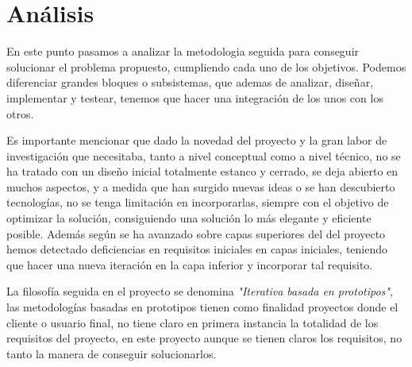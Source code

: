 \chapter{Análisis}

\bigskip
En este punto pasamos a analizar la metodologia seguida para conseguir solucionar el problema propuesto, cumpliendo cada uno de los objetivos. 
Podemos diferenciar grandes bloques o subsistemas, que ademas de analizar, diseñar, implementar y testear, tenemos que  hacer una integración de los unos con los otros.

\bigskip
Es importante mencionar que dado la novedad del proyecto y la gran labor de investigación que necesitaba, tanto a nivel conceptual como a nivel técnico, no se ha tratado con un diseño inicial totalmente estanco y cerrado, se deja abierto en muchos aspectos, y a medida que han surgido nuevas ideas o se han descubierto tecnologías, no se tenga limitación en incorporarlas, siempre con el objetivo de  optimizar la solución, consiguiendo una solución lo más elegante y eficiente posible. Además según se ha avanzado sobre capas superiores del del proyecto hemos detectado deficiencias en requisitos iniciales en capas iniciales, teniendo que hacer una nueva iteración en la capa inferior y incorporar tal requisito. 

\bigskip
La filosofía seguida en el proyecto se denomina \textit{"Iterativa basada en prototipos"}, las metodologías basadas en prototipos tienen como finalidad proyectos donde el cliente o usuario final, no tiene claro en primera instancia la totalidad de los requisitos del proyecto, en este proyecto aunque se tienen claros los requisitos, no tanto la manera de conseguir solucionarlos.


  

